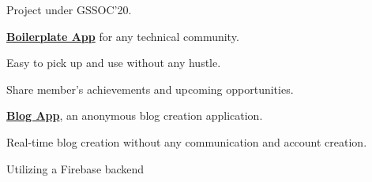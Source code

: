\documentclass[]{deedy-resume-reversed}
\begin{document}
\begin{minipage}[t]{0.60\textwidth}
\descript{}
\begin{tightemize}
\item Project under GSSOC'20.
\item \textbf{\href{https://github.com/smaranjitghose/girlscript_app}{Boilerplate App}} for any technical community.
\item Easy to pick up and use without any hustle.
\item Share member’s achievements and upcoming opportunities.
\end{tightemize}
\sectionsep

\descript{}
\begin{tightemize}
\item \textbf{\href{http://www.chit-chat.net/}{Blog App}}, an anonymous blog creation application.
\item Real-time blog creation without any communication and account creation.
\item Utilizing a Firebase backend
\end{tightemize}
\sectionsep







\end{minipage}
\end{document}
